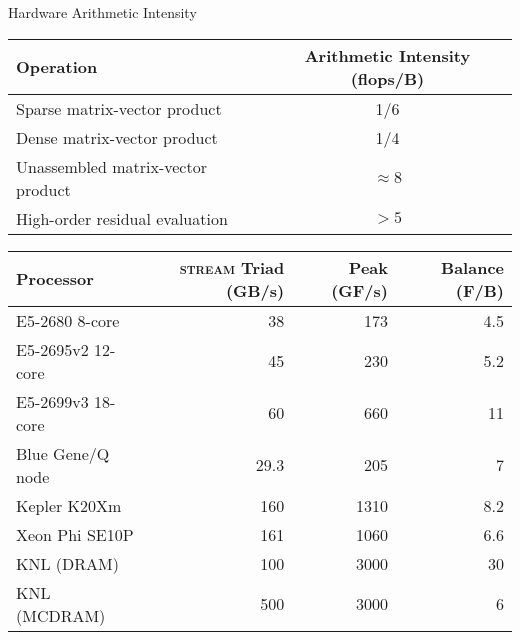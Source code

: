 \begin{frame}{Hardware Arithmetic Intensity}
  \begin{tabular}{lc}
    \toprule
    Operation                         & Arithmetic Intensity (flops/B) \\
    \midrule
    Sparse matrix-vector product      & 1/6                  \\
    Dense matrix-vector product       & 1/4                  \\
    Unassembled matrix-vector product & $\approx 8$          \\
    High-order residual evaluation    & $> 5$                \\
    \bottomrule
  \end{tabular}

  \bigskip

  \begin{tabular}{lrrr}
    \toprule
    Processor & \textsc{stream} Triad (GB/s) & Peak (GF/s) & Balance (F/B) \\
    \midrule
    E5-2680 8-core      & 38   & 173  & 4.5 \\ %
    E5-2695v2 12-core & 45 & 230 & 5.2 \\ %
    E5-2699v3 18-core & 60 & 660 & 11 \\
    Blue Gene/Q node    & 29.3   & 205  & 7 \\ %
    Kepler K20Xm        & 160 & 1310 & 8.2 \\ %
    Xeon Phi SE10P      & 161 & 1060 & 6.6 \\ %
    \midrule
    KNL (DRAM) & 100 & 3000 & 30 \\
    KNL (MCDRAM) & 500 & 3000 & 6 \\
    \bottomrule
  \end{tabular}
\end{frame}
